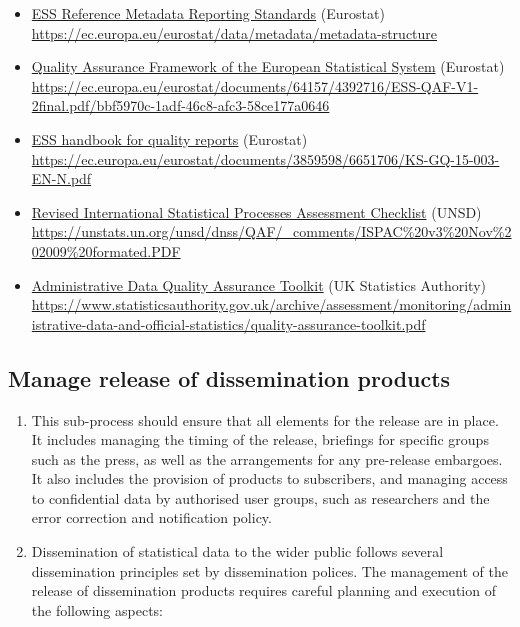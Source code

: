 \documentclass[
]{article}
\begin{document}
\begin{itemize}
\item
  \href{https://ec.europa.eu/eurostat/data/metadata/metadata-structure}{ESS Reference Metadata Reporting
  Standards}
  (Eurostat)\\
  {\url{https://ec.europa.eu/eurostat/data/metadata/metadata-structure}}
\item
  \href{https://ec.europa.eu/eurostat/documents/64157/4392716/ESS-QAF-V1-2final.pdf/bbf5970c-1adf-46c8-afc3-58ce177a0646}{Quality Assurance Framework of the European Statistical
  System}
  (Eurostat){\textbf{\\
  }\url{https://ec.europa.eu/eurostat/documents/64157/4392716/ESS-QAF-V1-2final.pdf/bbf5970c-1adf-46c8-afc3-58ce177a0646}}
\item
  \href{https://ec.europa.eu/eurostat/documents/3859598/6651706/KS-GQ-15-003-EN-N.pdf}{ESS handbook for quality
  reports}
  (Eurostat)\\
  \url{https://ec.europa.eu/eurostat/documents/3859598/6651706/KS-GQ-15-003-EN-N.pdf}
\item
  \href{https://unstats.un.org/unsd/dnss/QAF_comments/ISPAC\%20v3\%20Nov\%202009\%20formated.PDF}{Revised International Statistical Processes Assessment
  Checklist}
  (UNSD)\\
  {\url{https://unstats.un.org/unsd/dnss/QAF/_comments/ISPAC\%20v3\%20Nov\%202009\%20formated.PDF}}
\item
  \href{https://www.statisticsauthority.gov.uk/archive/assessment/monitoring/administrative-data-and-official-statistics/quality-assurance-toolkit.pdf}{Administrative Data Quality Assurance
  Toolkit}
  (UK Statistics Authority)\\
  \url{https://www.statisticsauthority.gov.uk/archive/assessment/monitoring/administrative-data-and-official-statistics/quality-assurance-toolkit.pdf}
\end{itemize}

\hypertarget{manage-release-of-dissemination-products}{%
\subsection{Manage release of dissemination products}\label{manage-release-of-dissemination-products}}

\begin{enumerate}
\def\labelenumi{\arabic{enumi}.}
\setcounter{enumi}{522}
\item
  This sub-process should ensure that all elements for the release
  are in place. It includes managing the timing of the release,
  briefings for specific groups such as the press, as well as the
  arrangements for any pre-release embargoes. It also includes the
  provision of products to subscribers, and managing access to
  confidential data by authorised user groups, such as researchers and
  the error correction and notification policy.
\item
  Dissemination of statistical data to the wider public follows
  several dissemination principles set by dissemination polices. The
  management of the release of dissemination products requires careful
  planning and execution of the following aspects:
\end{enumerate}
\end{document}
